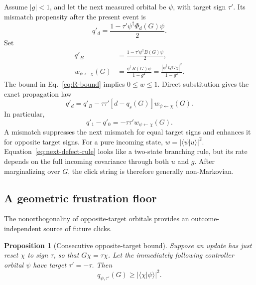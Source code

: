 \documentclass[
  aps,prx,twocolumn,superscriptaddress,longbibliography,
  nofootinbib,floatfix
]{revtex4-2}
\theoremstyle{plain}
\newtheorem{proposition}{Proposition}
\theoremstyle{definition}
\begin{document}
Assume \(|g|<1\), and let the next measured orbital be \(\psi\), with target
sign \(\tau'\).  Its
mismatch propensity after the present event is
\begin{equation}
 q'_{d}=\frac{1-\tau'\psi^\dagger\Phi_d(G)\psi}{2}.
 \label{eq:next-q-definition}
\end{equation}
Set
\begin{align}
 q'_B&=\frac{1-\tau'\psi^\dagger B(G)\psi}{2},
 \nonumber\\
 w_{\psi\leftarrow\chi}(G)
 &=\frac{\psi^\dagger R(G)\psi}{1-g^2}
 =\frac{|\psi^\dagger QG\chi|^2}{1-g^2}.
 \label{eq:propagation-weight}
\end{align}
The bound in Eq.~\eqref{eq:R-bound} implies \(0\leq w\leq1\).  Direct
substitution gives the exact propagation law
\begin{equation}
 \boxed{
 q'_d=q'_B-\tau\tau'[d-q_s(G)]w_{\psi\leftarrow\chi}(G).}
 \label{eq:next-defect-rule}
\end{equation}
In particular,
\begin{equation}
 q'_1-q'_0=-\tau\tau'w_{\psi\leftarrow\chi}(G).
 \label{eq:branching-sign}
\end{equation}
A mismatch suppresses the next mismatch for equal target signs and enhances it
for opposite target signs.  For a pure incoming state,
\(w=|\langle\psi|u\rangle|^2\).  Equation~\eqref{eq:next-defect-rule} looks
like a two-state branching rule, but its rate depends on the full incoming
covariance through both \(u\) and \(g\).  After marginalizing over \(G\), the
click string is therefore generally non-Markovian.

\subsection{A geometric frustration floor}

The nonorthogonality of opposite-target orbitals provides an outcome-independent
source of future clicks.

\begin{proposition}[Consecutive opposite-target bound]
Suppose an update has just reset \(\chi\) to sign \(\tau\), so that
\(G\chi=\tau\chi\).  Let the immediately following controller orbital
\(\psi\) have target \(\tau'=-\tau\).  Then
\begin{equation}
 q_{\psi,\tau'}(G)\geq|\langle\chi|\psi\rangle|^2.
 \label{eq:overlap-floor}
\end{equation}
\end{proposition}
\end{document}
